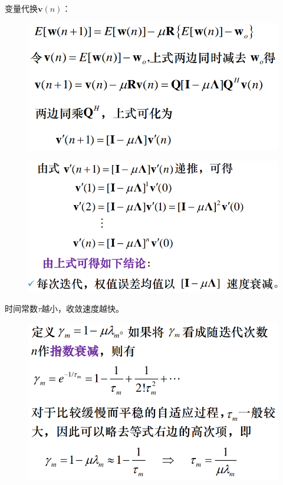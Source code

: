 \documentclass[UTF8]{ctexart} %
\begin{document}
			变量代换$\bm{v}(n)$：
			\begin{figure}[H]
				\centering\includegraphics[scale=0.4]{36.png}
			\end{figure}
			\begin{figure}[H]
				\centering\includegraphics[scale=0.4]{37.png}
			\end{figure}
			时间常数$\tau$越小，收敛速度越快。
			\begin{figure}[H]
				\centering\includegraphics[scale=0.4]{38.png}
			\end{figure}
\end{document}
